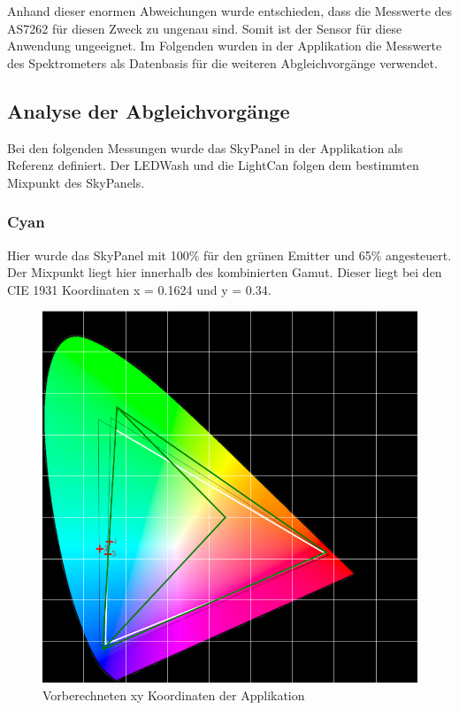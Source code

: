 \documentclass[11pt]{scrartcl}
\begin{document}
\noindent
Anhand dieser enormen Abweichungen wurde entschieden, dass die Messwerte des AS7262 für diesen Zweck zu ungenau sind. Somit ist
der Sensor für diese Anwendung ungeeignet. Im Folgenden wurden in der Applikation die Messwerte des Spektrometers als Datenbasis
für die weiteren Abgleichvorgänge verwendet.
\subsection{Analyse der Abgleichvorgänge}
Bei den folgenden Messungen wurde das SkyPanel in der Applikation als Referenz definiert. Der LEDWash und die LightCan folgen
dem bestimmten Mixpunkt des SkyPanels.
\subsubsection{Cyan}
Hier wurde das SkyPanel mit 100\% für den grünen Emitter und 65\% angesteuert. Der Mixpunkt liegt hier innerhalb des
kombinierten Gamut. Dieser liegt bei den CIE 1931 Koordinaten x = 0.1624 und y = 0.34.
\begin{figure}[H]
    \begin{center}
        \includegraphics[width=.8\textwidth]{images/app_mix_cyan_cie.png}
    \end{center}
    \caption{Vorberechneten xy Koordinaten der Applikation}
\end{figure}
\noindent
\end{document}
